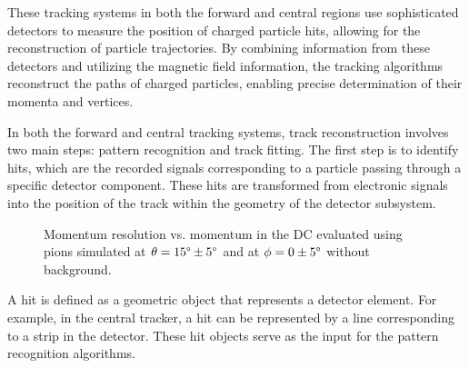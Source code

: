     These tracking systems in both the forward and central regions use sophisticated detectors to measure the position of charged particle hits, allowing for the reconstruction of particle trajectories.
    By combining information from these detectors and utilizing the magnetic field information, the tracking algorithms reconstruct the paths of charged particles, enabling precise determination of their momenta and vertices.

    In both the forward and central tracking systems, track reconstruction involves two main steps: pattern recognition and track fitting.
    The first step is to identify hits, which are the recorded signals corresponding to a particle passing through a specific detector component.
    These hits are transformed from electronic signals into the position of the track within the geometry of the detector subsystem.

    \begin{figure}
        \centering{}
        \caption[DC momentum resolution vs momentum.]{Momentum resolution vs. momentum in the DC evaluated using pions simulated at $\theta = 15\degree \pm 5\degree$ and at $\phi = 0 \pm 5\degree$ without background.}
        \label{fig::dc_pres}
    \end{figure}


    A hit is defined as a geometric object that represents a detector element.
    For example, in the central tracker, a hit can be represented by a line corresponding to a strip in the detector.
    These hit objects serve as the input for the pattern recognition algorithms.

